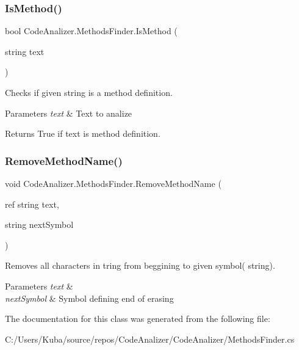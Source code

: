 \subsubsection{\texorpdfstring{Is\+Method()}{IsMethod()}}
{\footnotesize\ttfamily bool Code\+Analizer.\+Methods\+Finder.\+Is\+Method (\begin{DoxyParamCaption}\item[{string}]{text }\end{DoxyParamCaption})}



Checks if given string is a method definition. 


\begin{DoxyParams}{Parameters}
{\em text} & Text to analize\\
\hline
\end{DoxyParams}
\begin{DoxyReturn}{Returns}
True if text is method definition.
\end{DoxyReturn}
\mbox{\label{class_code_analizer_1_1_methods_finder_a206466c8e627761ee4f1058658c942bc}} 
\subsubsection{\texorpdfstring{Remove\+Method\+Name()}{RemoveMethodName()}}
{\footnotesize\ttfamily void Code\+Analizer.\+Methods\+Finder.\+Remove\+Method\+Name (\begin{DoxyParamCaption}\item[{ref string}]{text,  }\item[{string}]{next\+Symbol }\end{DoxyParamCaption})}



Removes all characters in tring from beggining to given symbol( string). 


\begin{DoxyParams}{Parameters}
{\em text} & \\
\hline
{\em next\+Symbol} & Symbol defining end of erasing\\
\hline
\end{DoxyParams}


The documentation for this class was generated from the following file\+:\begin{DoxyCompactItemize}
\item 
C\+:/\+Users/\+Kuba/source/repos/\+Code\+Analizer/\+Code\+Analizer/Methods\+Finder.\+cs\end{DoxyCompactItemize}
